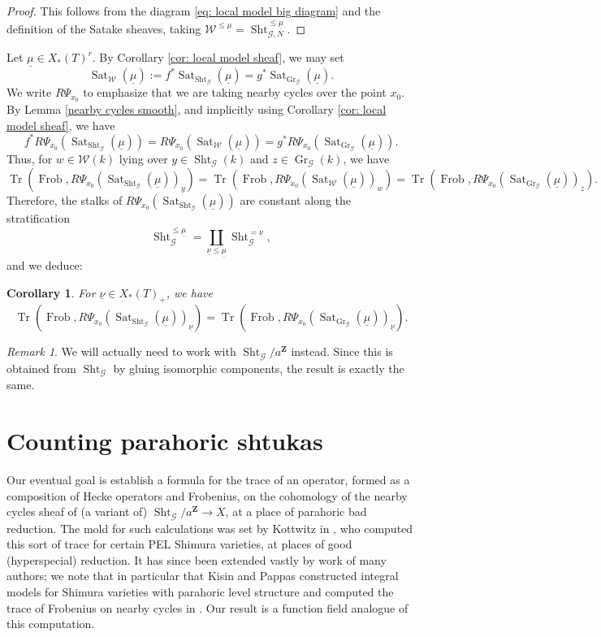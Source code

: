 \documentclass[reqno]{amsart}
\numberwithin{equation}{section}
\newcommand{\Z}{\mathbf{Z}}
\newcommand{\ul}[1]{\underline{#1}}
\newcommand{\Cal}[1]{\mathcal{#1}}
\DeclareMathOperator{\Frob}{Frob}
\DeclareMathOperator{\Tr}{Tr}
\DeclareMathOperator{\Gr}{Gr}
\DeclareMathOperator{\Sht}{Sht}
\DeclareMathOperator{\Sat}{Sat}
\newtheorem{cor}[thm]{Corollary}
\theoremstyle{remark}
\newtheorem{remark}[thm]{Remark}
\numberwithin{equation}{section}
\begin{document}
\begin{proof}
This follows from the diagram \eqref{eq: local model big diagram} and the definition of the Satake sheaves, taking $\Cal{W}^{\leq \ul{\mu}}  = \Sht_{\Cal{G}, N}^{\leq \ul{\mu}}$. 
\end{proof}



Let $\ul{\mu} \in X_*(T)^r$. By Corollary \ref{cor: local model sheaf}, we may set 
\[
\Sat_{\Cal{W}}(\ul{\mu}) :=  f^* \Sat_{\Sht_{\Cal{G}}}(\ul{\mu}) =  g^* \Sat_{\Gr_{\Cal{G}}}(\ul{\mu}).
\]
We write $R\Psi_{x_0}$  to emphasize that we are taking nearby cycles over the point $x_0$. By Lemma \ref{nearby cycles smooth}, and implicitly using Corollary \ref{cor: local model sheaf}, we have 
\[
f^* R\Psi_{x_0}(\Sat_{\Sht_{\Cal{G}}}(\ul{\mu}))  =  R\Psi_{x_0}(\Sat_{\Cal{W}}(\ul{\mu})) = g^* R\Psi_{x_0}(\Sat_{\Gr_{\Cal{G}}}(\ul{\mu})). 
\]
Thus, for $w \in \Cal{W}(k)$ lying over $y \in \Sht_{\Cal{G}}(k)$ and $z \in \Gr_{\Cal{G}}(k)$, we have 
\[
\Tr(\Frob, R\Psi_{x_0}(\Sat_{\Sht_{\Cal{G}}}(\ul{\mu}))_y) = \Tr(\Frob, R\Psi_{x_0}(\Sat_{\Cal{W}}(\ul{\mu}))_w) =  \Tr(\Frob, R \Psi_{x_0}(\Sat_{\Gr_{\Cal{G}}}(\ul{\mu}))_z). 
\]
Therefore, the stalks of $R \Psi_{x_0}(\Sat_{\Sht_{\Cal{G}}}(\ul{\mu}))$ are constant along the stratification 
\[
\Sht_{\Cal{G}}^{\leq \ul{\mu}} = \coprod_{\ul{\nu} \leq \ul{\mu}} \Sht_{\Cal{G}}^{=\ul{\nu}},
\]
and we deduce:

\begin{cor}\label{cor: kottwitz for shtukas}
For $\ul{\nu} \in X_*(T)_+$, we have  
\[
\Tr(\Frob, R \Psi_{x_0}(\Sat_{\Sht_{\Cal{G}}}(\ul{\mu}))_{\ul{\nu}} ) = \Tr(\Frob, R\Psi_{x_0}( \Sat_{\Gr_{\Cal{G}}}(\ul{\mu}))_{\ul{\nu}}).
\]
\end{cor}





\begin{remark}We will actually need to work with $\Sht_{\Cal{G}}/a^{\Z}$ instead. Since this is obtained from $\Sht_{\Cal{G}}$ by gluing isomorphic components, the result is exactly the same. 
\end{remark}



\section{Counting parahoric shtukas} \label{counting fixed points}

Our eventual goal is establish a formula for the trace of an operator, formed as a composition of Hecke operators and Frobenius, on the cohomology of the nearby  cycles sheaf of (a variant of) $\Sht_{\Cal{G}}/a^{\Z} \rightarrow X$, at a place of parahoric bad reduction. The mold for such calculations was set by Kottwitz in \cite{Kott92}, who computed this sort of trace for certain PEL Shimura varieties, at places of good (hyperspecial) reduction. It has since been extended vastly by work of many authors; we note that in particular that Kisin and Pappas constructed integral models for Shimura varieties with parahoric level structure and computed the  trace of Frobenius on nearby cycles in \cite{KP15}. Our result is a function field analogue of this computation. 
\end{document}
